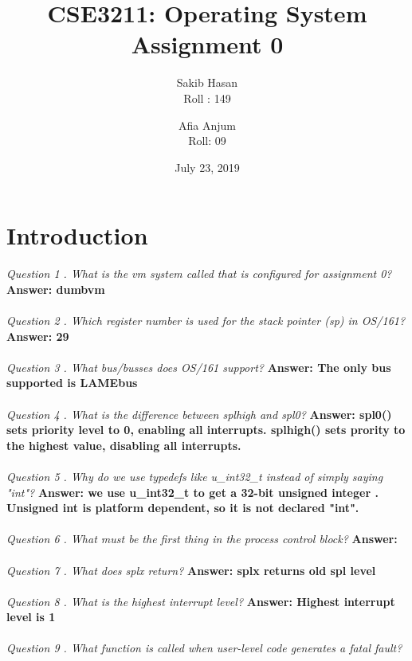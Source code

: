 \documentclass[11pt, english]{article}
\title{CSE3211: Operating System Assignment 0} %
\author{Sakib Hasan\\
	 Roll : 149
	\and
Afia Anjum\\
Roll: 09
}
\date{July 23, 2019} %
\begin{document}
\maketitle
\section{Introduction}
\textit{ Question 1 .  What is the vm system called that is configured for assignment 0?  }\newline
\textbf{Answer: dumbvm}\\ \\
\textit{ Question 2 .  Which register number is used for the stack pointer (sp) in OS/161?  }\newline
\textbf{Answer: 29}\\ \\
\textit{ Question 3 .  What bus/busses does OS/161 support?  }\newline
\textbf{Answer: The only bus supported is LAMEbus}\\ \\
\textit{ Question 4 .  What is the difference between splhigh and spl0?  }\newline
\textbf{Answer: spl0() sets priority level to 0, enabling all interrupts. splhigh() sets prority to the highest value, disabling all interrupts.}\\ \\
\textit{ Question 5 .  Why do we use typedefs like u\_int32\_t instead of simply saying "int"?  }\newline
\textbf{Answer: we use  u\_int32\_t to get a 32-bit unsigned integer . Unsigned int is platform dependent, so it is not declared "int".}\\ \\
\textit{ Question 6 .  What must be the first thing in the process control block?  }\newline
\textbf{Answer: }\\ \\
\textit{ Question 7 .  What does splx return?  }\newline
\textbf{Answer: splx returns old spl level}\\ \\
\textit{ Question 8 .  What is the highest interrupt level?  }\newline
\textbf{Answer: Highest interrupt level is 1 }\\ \\
\textit{ Question 9 .  What function is called when user-level code generates a fatal fault?  }\newline
\end{document}
